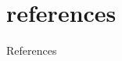 \section*{references}


\begin{frame}[allowframebreaks]{References}
    \printbibliography
\end{frame} 
